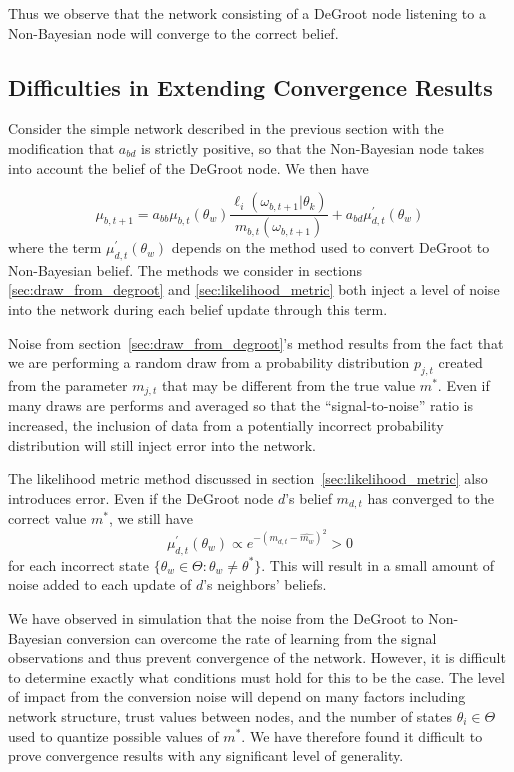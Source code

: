 \documentclass[letterpaper, 11pt, conference]{ieeeconf}
\begin{document}
Thus we observe that the network consisting of a DeGroot node listening to a Non-Bayesian node will converge to the correct belief.

\subsection{Difficulties in Extending Convergence Results}
Consider the simple network described in the previous section with the modification that $a_{bd}$ is strictly positive, so that the Non-Bayesian node takes into account the belief of the DeGroot node.  We then have

\begin{equation}
\mu_{b,t+1} = a_{bb}\mu_{b,t}(\theta_w)\frac{\ell_i(\omega_{b,t+1}|\theta_k)}{m_{b,t}(\omega_{b,t+1})} + a_{bd}\mu_{d,t}^\prime(\theta_w)
\end{equation}
where the term $\mu_{d,t}^\prime(\theta_w)$ depends on the method used to convert DeGroot to Non-Bayesian belief.  The methods we consider in sections \ref{sec:draw_from_degroot} and \ref{sec:likelihood_metric} both inject a level of noise into the network during each belief update through this term.

Noise from section~\ref{sec:draw_from_degroot}'s method results from the fact that we are performing a random draw from a probability distribution $p_{j,t}$ created from the parameter $m_{j,t}$ that may be different from the true value $m^*$.  Even if many draws are performs and averaged so that the ``signal-to-noise'' ratio is increased, the inclusion of data from a potentially incorrect probability distribution will still inject error into the network.

The likelihood metric method discussed in section~\ref{sec:likelihood_metric} also introduces error.  Even if the DeGroot node $d$'s belief $m_{d,t}$ has converged to the correct value $m^*$, we still have
\begin{equation}
\mu_{d,t}^\prime(\theta_w) \propto e^{-(m_{d,t} - \hat{m_w})^2} > 0
\end{equation}
for each incorrect state $\{ \theta_w \in \Theta : \theta_w \neq \theta^* \}$.  This will result in a small amount of noise added to each update of $d$'s neighbors' beliefs.

We have observed in simulation that the noise from the DeGroot to Non-Bayesian conversion can overcome the rate of learning from the signal observations and thus prevent convergence of the network.  However, it is difficult to determine exactly what conditions must hold for this to be the case.  The level of impact from the conversion noise will depend on many factors including network structure, trust values between nodes, and the number of states $\theta_i \in \Theta$ used to quantize possible values of $m^*$.  We have therefore found it difficult to prove convergence results with any significant level of generality.
\end{document}

